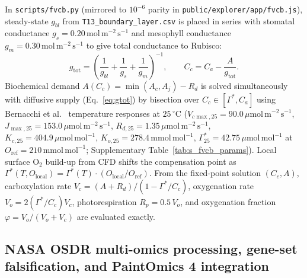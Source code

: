 \documentclass[final,5p,times,twocolumn,numbers,sort&compress]{elsarticle}
\newcommand{\ums}{\ensuremath{\mu\mathrm{mol\,m^{-2}\,s^{-1}}}}
\newcommand{\molms}{\ensuremath{\mathrm{mol\,m^{-2}\,s^{-1}}}}
\begin{document}
In \texttt{scripts/fvcb.py} (mirrored to $10^{-6}$ parity in \texttt{public/explorer/app/fvcb.js}), steady-state $g_{bl}$ from \texttt{T13\_boundary\_layer.csv} is placed in series with stomatal conductance $g_s = 0.20\,\molms$ and mesophyll conductance $g_m = 0.30\,\molms$ to give total conductance to Rubisco:
\begin{equation}
g_{\mathrm{tot}} = \left(\frac{1}{g_{bl}} + \frac{1}{g_s} + \frac{1}{g_m}\right)^{-1}, \qquad C_c = C_a - \frac{A}{g_{\mathrm{tot}}}.
\label{eq:gtot}
\end{equation}
Biochemical demand $A(C_c) = \min(A_c, A_j) - R_d$ is solved simultaneously with diffusive supply (Eq.~\ref{eq:gtot}) by bisection over $C_c \in [\Gamma^*, C_a]$ using Bernacchi et al.~\citep{bernacchi2001,bernacchi2003} temperature responses at $25\,^\circ\mathrm{C}$ ($V_{c\max,25} = 90.0\,\ums$, $J_{\max,25} = 153.0\,\ums$, $R_{d,25} = 1.35\,\ums$, $K_{c,25} = 404.9\,\mu\mathrm{mol\,mol^{-1}}$, $K_{o,25} = 278.4\,\mathrm{mmol\,mol^{-1}}$, $\Gamma^*_{25} = 42.75\,\mu\mathrm{mol\,mol^{-1}}$ at $O_{\mathrm{ref}} = 210\,\mathrm{mmol\,mol^{-1}}$; Supplementary Table~\ref{tab:s_fvcb_params}). Local surface $\mathrm{O_2}$ build-up from CFD shifts the compensation point as $\Gamma^*(T, O_{\mathrm{local}}) = \Gamma^*(T)\cdot(O_{\mathrm{local}}/O_{\mathrm{ref}})$. From the fixed-point solution $(C_c, A)$, carboxylation rate $V_c = (A + R_d)/(1 - \Gamma^*/C_c)$, oxygenation rate $V_o = 2(\Gamma^*/C_c)V_c$, photorespiration $R_p = 0.5\,V_o$, and oxygenation fraction $\varphi = V_o/(V_o+V_c)$ are evaluated exactly.

\subsection{NASA OSDR multi-omics processing, gene-set falsification, and PaintOmics 4 integration}
\end{document}
